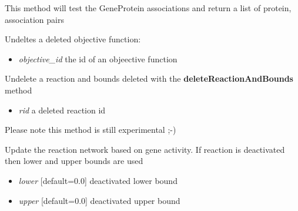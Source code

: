 \documentclass[a4paper,11pt,english]{sphinxmanual}
\begin{document}
\begin{fulllineitems}
\begin{fulllineitems}
\end{fulllineitems}


\begin{fulllineitems}
\label{modules_doc:cbmpy.CBModel.Model.testGeneProteinAssociations}
This method will test the GeneProtein associations and return a list of protein, association pairs

\end{fulllineitems}


\begin{fulllineitems}
\label{modules_doc:cbmpy.CBModel.Model.undeleteObjective}
Undeltes a deleted objective function:
\begin{itemize}
\item {} 
\emph{objective\_id} the id of an objeective function

\end{itemize}

\end{fulllineitems}


\begin{fulllineitems}
\label{modules_doc:cbmpy.CBModel.Model.undeleteReactionAndBounds}
Undelete a reaction and bounds deleted with the \textbf{deleteReactionAndBounds} method
\begin{itemize}
\item {} 
\emph{rid} a deleted reaction id

\end{itemize}

Please note this method is still experimental ;-)

\end{fulllineitems}


\begin{fulllineitems}
\label{modules_doc:cbmpy.CBModel.Model.updateNetwork}
Update the reaction network based on gene activity. If reaction is deactivated then lower and upper bounds are used
\begin{itemize}
\item {} 
\emph{lower} {[}default=0.0{]} deactivated lower bound

\item {} 
\emph{upper} {[}default=0.0{]} deactivated upper bound

\end{itemize}

\end{fulllineitems}


\end{fulllineitems}
\end{document}
